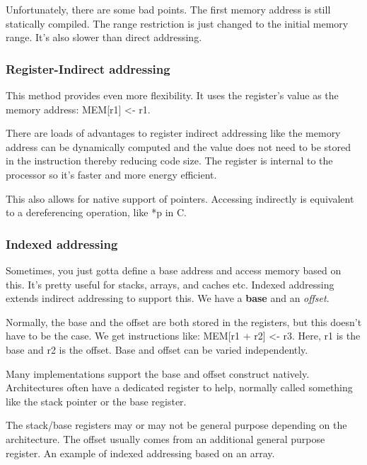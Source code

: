 \documentclass[11pt,a4paper,titlepage,dvipsnames,cmyk]{scrartcl}
\begin{document}
Unfortunately, there are some bad points. The first memory address is
still statically compiled. The range restriction is just changed to the
initial memory range. It's also slower than direct addressing.

\subsubsection{Register-Indirect addressing}%
\label{ssub:register-indirect}

This method provides even more flexibility. It uses the register's value
as the memory address: MEM[r1] <- r1.

There are loads of advantages to register indirect addressing like the
memory address can be dynamically computed and the value does not need to
be stored in the instruction thereby reducing code size. The register is
internal to the processor so it's faster and more energy efficient.

This also allows for native support of pointers. Accessing indirectly is
equivalent to a dereferencing operation, like *p in C.

\subsubsection{Indexed addressing}%
\label{ssub:indexed}
Sometimes, you just gotta define a base address and access memory based on
this. It's pretty useful for stacks, arrays, and caches etc. Indexed
addressing extends indirect addressing to support this. We have a
\textbf{base} and an \textit{offset}.

Normally, the base and the offset are both stored in the registers, but
this doesn't have to be the case. We get instructions like: MEM[r1 + r2]
<- r3. Here, r1 is the base and r2 is the offset. Base and offset can be
varied independently.

Many implementations support the base and offset construct natively.
Architectures often have a dedicated register to help, normally called
something like the stack pointer or the base register.

The stack/base registers may or may not be general purpose depending on
the architecture. The offset usually comes from an additional general
purpose register. An example of indexed addressing based on an array. 
\end{document}
